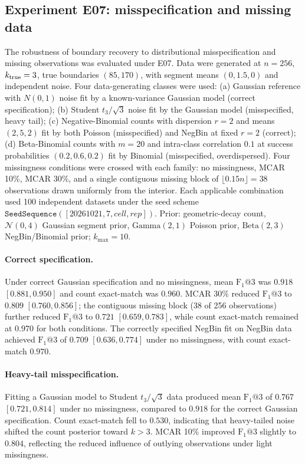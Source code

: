 \subsection{Experiment E07: misspecification and missing data}
The robustness of boundary recovery to distributional misspecification and missing
observations was evaluated under E07.
Data were generated at $n=256$, $k_{\rm true}=3$, true boundaries $(85,170)$,
with segment means $(0,1.5,0)$ and independent noise.
Four data-generating classes were used: (a) Gaussian reference with $N(0,1)$ noise
fit by a known-variance Gaussian model (correct specification);
(b) Student $t_3/\sqrt{3}$ noise fit by the Gaussian model (misspecified, heavy tail);
(c) Negative-Binomial counts with dispersion $r=2$ and means $(2,5,2)$ fit by both
Poisson (misspecified) and NegBin at fixed $r=2$ (correct);
(d) Beta-Binomial counts with $m=20$ and intra-class correlation $0.1$ at success
probabilities $(0.2,0.6,0.2)$ fit by Binomial (misspecified, overdispersed).
Four missingness conditions were crossed with each family: no missingness, MCAR 10\%,
MCAR 30\%, and a single contiguous missing block of $\lfloor 0.15n\rfloor = 38$
observations drawn uniformly from the interior.
Each applicable combination used 100 independent datasets under the
seed scheme $\mathtt{SeedSequence}([20261021,7,\textit{cell},\textit{rep}])$.
Prior: geometric-decay count, $\mathcal{N}(0,4)$ Gaussian segment prior,
$\mathrm{Gamma}(2,1)$ Poisson prior, $\mathrm{Beta}(2,3)$ NegBin/Binomial prior;
$k_{\max}=10$.

\paragraph{Correct specification.}
Under correct Gaussian specification and no missingness, mean
$\mathrm{F}_1@3$ was $0.918$ $[0.881, 0.950]$ and count exact-match was
$0.960$. MCAR 30\% reduced $\mathrm{F}_1@3$ to $0.809$ $[0.760, 0.856]$;
the contiguous missing block (38 of 256 observations) further reduced
$\mathrm{F}_1@3$ to $0.721$ $[0.659, 0.783]$, while count exact-match
remained at $0.970$ for both conditions.
The correctly specified NegBin fit on NegBin data achieved $\mathrm{F}_1@3$
of $0.709$ $[0.636, 0.774]$ under no missingness, with count exact-match
$0.970$.

\paragraph{Heavy-tail misspecification.}
Fitting a Gaussian model to Student $t_3/\sqrt{3}$ data produced mean
$\mathrm{F}_1@3$ of $0.767$ $[0.721, 0.814]$ under no missingness, compared
to $0.918$ for the correct Gaussian specification.
Count exact-match fell to $0.530$, indicating that heavy-tailed noise
shifted the count posterior toward $k>3$.
MCAR 10\% improved $\mathrm{F}_1@3$ slightly to $0.804$,
reflecting the reduced influence of outlying observations under light missingness.

